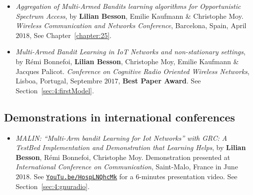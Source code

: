\begin{itemize}
\item
    \emph{Aggregation of Multi-Armed Bandits learning algorithms for Opportunistic Spectrum Access},
    by \textbf{Lilian Besson}, Emilie Kaufmann \& Christophe Moy.
    \emph{Wireless Communication and Networks Conference},
    Barcelona, Spain, April $2018$,
    See Chapter~\ref{chapter:25}.
    \cite{Besson2018WCNC}

\item
    \emph{Multi-Armed Bandit Learning in IoT Networks and non-stationary settings},
    by Rémi Bonnefoi, \textbf{Lilian Besson}, Christophe Moy, Emilie Kaufmann \& Jacques Palicot.
    \emph{Conference on Cognitive Radio Oriented Wireless Networks},
    Lisboa, Portugal, Septembre $2017$,
    \textbf{Best Paper Award}.
    See Section~\ref{sec:4:firstModel}.
    \cite{Bonnefoi17}

\end{itemize}

\subsection*{Demonstrations in international conferences}

\begin{itemize}

\item
    \emph{MALIN: ``Multi-Arm bandit Learning for Iot Networks'' with GRC: A TestBed Implementation and Demonstration that Learning Helps},
    by \textbf{Lilian Besson}, Rémi Bonnefoi, Christophe Moy.
    Demonstration presented at \emph{International Conference on Communication},
    Saint-Malo, France in June $2018$.
    See \href{https://YouTu.be/HospLNQhcMk}{\texttt{YouTu.be/HospLNQhcMk}} for a $6$-minutes presentation video.
    See Section~\ref{sec:4:gnuradio}.
    \cite{Besson2018ICT}

\end{itemize}



